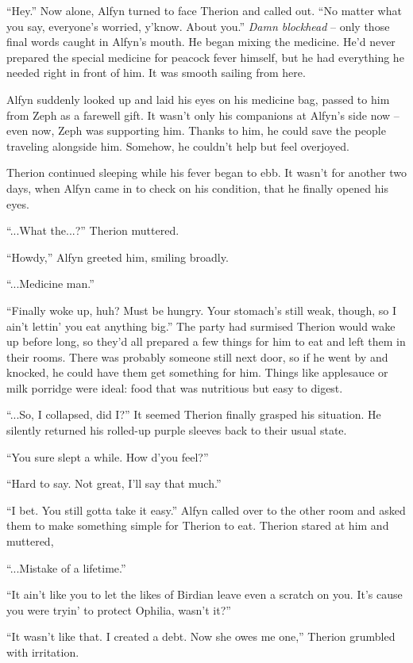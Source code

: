 ``Hey.'' Now alone, Alfyn turned to face Therion and called out. ``No matter what you say, everyone's worried, y'know. About you.'' \emph{Damn blockhead} -- only those final words caught in Alfyn's mouth. He began mixing the medicine. He'd never prepared the special medicine for peacock fever himself, but he had everything he needed right in front of him. It was smooth sailing from here.

Alfyn suddenly looked up and laid his eyes on his medicine bag, passed to him from Zeph as a farewell gift. It wasn't only his companions at Alfyn's side now -- even now, Zeph was supporting him. Thanks to him, he could save the people traveling alongside him. Somehow, he couldn't help but feel overjoyed.

Therion continued sleeping while his fever began to ebb. It wasn't for another two days, when Alfyn came in to check on his condition, that he finally opened his eyes.

``...What the...?'' Therion muttered.

``Howdy,'' Alfyn greeted him, smiling broadly.

``...Medicine man.''

``Finally woke up, huh? Must be hungry. Your stomach's still weak, though, so I ain't lettin' you eat anything big.'' The party had surmised Therion would wake up before long, so they'd all prepared a few things for him to eat and left them in their rooms. There was probably someone still next door, so if he went by and knocked, he could have them get something for him. Things like applesauce or milk porridge were ideal: food that was nutritious but easy to digest.

``...So, I collapsed, did I?'' It seemed Therion finally grasped his situation. He silently returned his rolled-up purple sleeves back to their usual state.

``You sure slept a while. How d'you feel?''

``Hard to say. Not great, I'll say that much.''

``I bet. You still gotta take it easy.'' Alfyn called over to the other room and asked them to make something simple for Therion to eat. Therion stared at him and muttered,

``...Mistake of a lifetime.''

``It ain't like you to let the likes of Birdian leave even a scratch on you. It's cause you were tryin' to protect Ophilia, wasn't it?''

``It wasn't like that. I created a debt. Now she owes me one,'' Therion grumbled with irritation.

